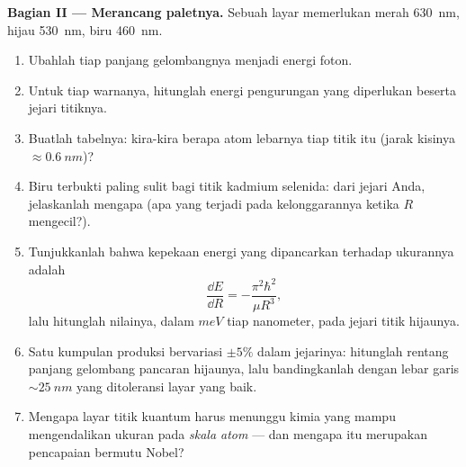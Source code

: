 \begin{problem}
\medskip\noindent\textbf{Bagian II --- Merancang paletnya.}
Sebuah layar memerlukan merah \qty{630}{nm}, hijau \qty{530}{nm}, biru
\qty{460}{nm}.
\begin{enumerate}[resume]
  \item Ubahlah tiap panjang gelombangnya menjadi energi foton.
  \item Untuk tiap warnanya, hitunglah energi pengurungan yang
        diperlukan beserta jejari titiknya.
  \item Buatlah tabelnya: kira-kira berapa atom lebarnya tiap titik itu
        (jarak kisinya $\approx \qty{0.6}{nm}$)?
  \item Biru terbukti paling sulit bagi titik kadmium selenida: dari
        jejari Anda, jelaskanlah mengapa (apa yang terjadi pada
        kelonggarannya ketika $R$ mengecil?).
  \item Tunjukkanlah bahwa kepekaan energi yang dipancarkan terhadap
        ukurannya adalah
        \[
        \frac{\dd E}{\dd R} = -\frac{\pi^2\hbar^2}{\mu R^3} ,
        \]
        lalu hitunglah nilainya, dalam $\unit{meV}$ tiap nanometer, pada
        jejari titik hijaunya.
  \item Satu kumpulan produksi bervariasi $\pm5\%$ dalam jejarinya:
        hitunglah rentang panjang gelombang pancaran hijaunya, lalu
        bandingkanlah dengan lebar garis $\sim\qty{25}{nm}$ yang
        ditoleransi layar yang baik.
  \item Mengapa layar titik kuantum harus menunggu kimia yang mampu
        mengendalikan ukuran pada \emph{skala atom} --- dan mengapa itu
        merupakan pencapaian bermutu Nobel?
\end{enumerate}


\end{problem}
